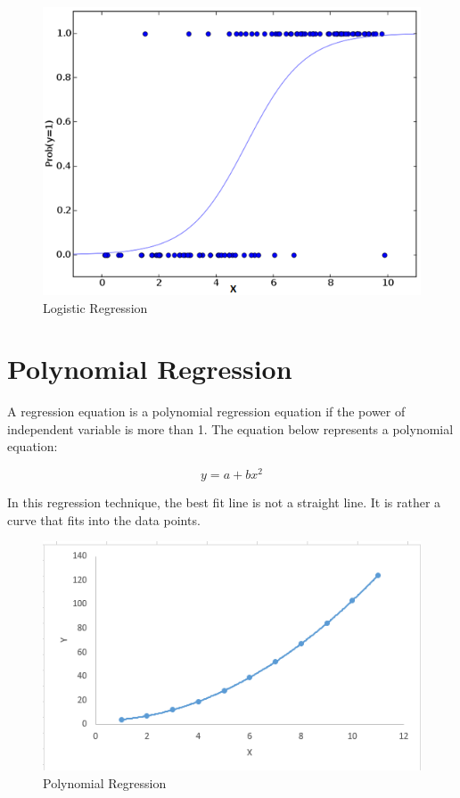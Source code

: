 \documentclass[11pt, a4paper]{report}
\begin{document}
\begin{figure}[!bth]
	\center
	\includegraphics[scale=0.5]{images/Logistic_Regression.png}
	\caption[Logistic Regression]{Logistic Regression \cite{desc:RegressionAnalysis}}
	\label{fig:logisticRegression}
\end{figure}


\section{Polynomial Regression}

A regression equation is a polynomial regression equation if the power of independent variable is more than 1. The equation below represents a polynomial equation:

\[ y=a+bx^2 \]

In this regression technique, the best fit line is not a straight line. It is rather a curve that fits into the data points. \cite{desc:RegressionAnalysis}

\begin{figure}[!bth]
	\center
	\includegraphics[scale=0.4]{images/Polynomial.png}
	\caption[Polynomial Regression]{Polynomial Regression \cite{desc:RegressionAnalysis}}
	\label{fig:ploynomialRegression}
\end{figure}
\end{document}
